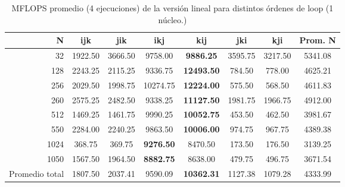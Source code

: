 \documentclass[11pt,a4paper]{article}
\begin{document}
\begin{table}[htbp]
\centering
\begin{tabular}{@{}rcccccc|c@{}}
\toprule
\textbf{N} & \textbf{ijk} & \textbf{jik} & \textbf{ikj} & \textbf{kij} & \textbf{jki} & \textbf{kji} & \textbf{Prom. N} \\
\midrule
32   & 1922.50 & 3666.50 & 9758.00  & \textbf{9886.25}  & 3595.75 & 3217.50 & 5341.08 \\
128  & 2243.25 & 2115.25 & 9336.75  & \textbf{12493.50} &  784.50 &  778.00 & 4625.21 \\
256  & 2029.50 & 1998.75 & 10274.75 & \textbf{12224.00} &  575.50 &  568.50 & 4611.83 \\
260  & 2575.25 & 2482.50 & 9338.25  & \textbf{11127.50} & 1981.75 & 1966.75 & 4912.00 \\
512  & 1469.25 & 1461.75 & 9990.25  & \textbf{10052.75} &  453.50 &  462.50 & 3981.67 \\
550  & 2284.00 & 2240.25 & 9863.50  & \textbf{10006.00} &  974.75 &  967.75 & 4389.38 \\
1024 &  368.75 &  369.75 & \textbf{9276.50}  &  8470.50 &  173.50 &  176.50 & 3139.25 \\
1050 & 1567.50 & 1964.50 & \textbf{8882.75}  &  8638.00 &  479.75 &  496.75 & 3671.54 \\
\midrule
Promedio total & 1807.50 & 2037.41 & 9590.09 & \textbf{10362.31} & 1127.38 & 1079.28 & 4333.99 \\
\bottomrule
\end{tabular}
\caption{MFLOPS promedio (4 ejecuciones) de la versión lineal para distintos órdenes de loop (1 núcleo.)}
\label{tab:loops}
\end{table}

\begingroup
\setlength{\parindent}{0pt}
\setlength{\parskip}{0.7em}
\sloppy


\endgroup
\end{document}
